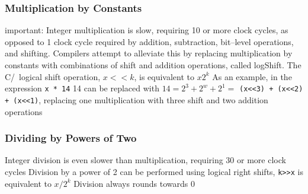 \documentclass[../bryant_comp_sys.tex]{subfiles}
\begin{document}
                    \subsubsection{Multiplication by Constants}
                        \begin{outline}
                            \1 \alert{important}: Integer multiplication is slow, requiring 10 or more clock cycles, as opposed to 1 clock cycle required by addition, subtraction, bit--level operations, and shifting.
                            \2 Compilers attempt to alleviate this by replacing multiplication by constants with combinations of shift and addition operations, called \gls{logShift}.
                            \1 The C/\Cpp~logical shift operation, \( x<<k \), is equivalent to \( x2^k \)
                            \1 As an example, in the expression \texttt{x * 14} 14 can be replaced with \( 14 = 2^3 + 2^w + 2^1 = \) \texttt{(x<<3) + (x<<2) + (x<<1)}, replacing one multiplication with three shift and two addition operations
                        \end{outline}

                    \subsubsection{Dividing by Powers of Two}
                        \begin{outline}
                            \1 Integer division is even slower than multiplication, requiring 30 or more clock cycles
                            \1 Division by a power of 2 can be performed using logical right shifts, \texttt{k>>x} is equivalent to \( x/2^k \)
                            \1 Division always rounds towards 0
                        \end{outline}
\end{document}
